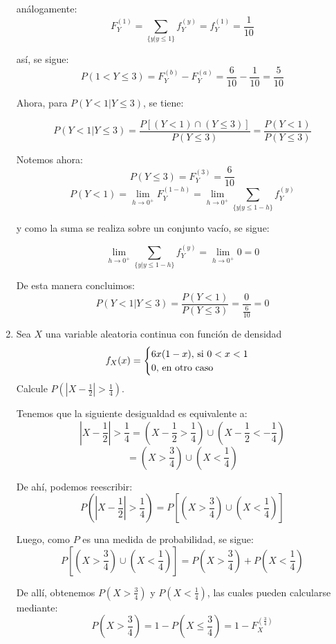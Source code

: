\documentclass[12pt,a4paper]{report}
\begin{document}
\begin{enumerate}
{\begin{enumerate}
{						análogamente:
						$$ F_Y^{(1)} = \sum_{\{y | y \leq 1 \}} f_Y^{(y)}
						 = f_Y^{(1)} = \frac{1}{10}$$

						así, se sigue:
						$$ P(1 < Y \leq 3) = F_Y^{(b)} - F_Y^{(a)}
						 = \frac{6}{10} - \frac{1}{10} = \frac{5}{10}$$

						Ahora, para $P(Y < 1 | Y \leq 3)$, se tiene:

						$$ P(Y < 1 | Y \leq 3)
						 = \frac{P[(Y < 1) \cap (Y \leq 3)]}{P(Y \leq 3)}
						 = \frac{P(Y < 1)}{P(Y \leq 3)}$$

						Notemos ahora:
						$$ P(Y \leq 3) = F_Y^{(3)} = \frac{6}{10} $$
						$$ P(Y < 1) = \lim_{h\to 0^+} F_Y^{(1 - h)}
						 = \lim_{h\to 0^+} \sum_{\{y | y \leq 1 - h \}} f_Y^{(y)} $$

						y como la suma se realiza sobre un conjunto vacío, se sigue:

						$$ \lim_{h\to 0^+} \sum_{\{y | y \leq 1 - h \}} f_Y^{(y)} = \lim_{h\to 0^+} 0 = 0 $$

						De esta manera concluimos:
						$$ P(Y < 1 | Y \leq 3) = \frac{P(Y < 1)}{P(Y \leq 3)}
						 = \frac{0}{\frac{6}{10}} = 0 $$
					}
				\end{enumerate}
		}

		\item {
			Sea $X$ una variable aleatoria continua con función de densidad
				\[
					f_X(x) = \begin{cases}
										6x(1-x), $ si $ 0 < x < 1\\
										0, $ en otro caso$
									 \end{cases}
				\]
			Calcule $P(|X-\frac{1}{2}| > \frac{1}{4})$.

			Tenemos que la siguiente desigualdad es equivalente a:
			$$ |X-\frac{1}{2}| > \frac{1}{4}
			   = (X-\frac{1}{2} > \frac{1}{4}) \cup (X-\frac{1}{2} < -\frac{1}{4})$$
			$$ = (X > \frac{3}{4}) \cup (X < \frac{1}{4}) $$

			De ahí, podemos reescribir:
				$$ P(|X-\frac{1}{2}| > \frac{1}{4})
				 = P[(X > \frac{3}{4}) \cup (X < \frac{1}{4})]$$

			Luego, como $P$ es una medida de probabilidad, se sigue:
				$$ P[(X > \frac{3}{4}) \cup (X < \frac{1}{4})]
				 = P(X > \frac{3}{4}) + P(X < \frac{1}{4}) $$

			De allí, obtenemos $P(X > \frac{3}{4})$ y $P(X < \frac{1}{4})$, las cuales
			pueden calcularse mediante:
				$$ P(X > \frac{3}{4}) = 1 - P(X \leq \frac{3}{4})
				 = 1 - F_X^{(\frac{3}{4})} $$

}
\end{enumerate}
\end{document}
